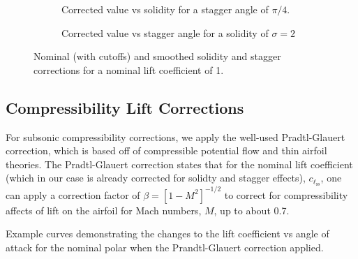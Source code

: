 \begin{figure}[htb]
     \centering
     \begin{subfigure}[t]{0.45\textwidth}
         \centering
        
        \caption{Corrected value vs solidity for a stagger angle of \(\pi/4\).}
        \label{fig:solidtysmoothed}
     \end{subfigure}
     \hfill
     \begin{subfigure}[t]{0.45\textwidth}
         \centering
         
         \caption{Corrected value vs stagger angle for a solidity of \(\sigma=2\)}
         \label{fig:staggersmoothed}
     \end{subfigure}
     \caption{Nominal (with cutoffs) and smoothed solidity and stagger corrections for a nominal lift coefficient of 1.}
        \label{fig:cascadesmoothed}
\end{figure}



\subsection{Compressibility Lift Corrections}


For subsonic compressibility corrections, we apply the well-used Pradtl-Glauert correction, which is based off of compressible potential flow and thin airfoil theories.
%
The Pradtl-Glauert correction states that for the nominal lift coefficient (which in our case is already corrected for solidty and stagger effects), \(c_{\ell_\text{ss}}\), one can apply a correction factor of \(\beta = \left[1-M^2\right]^{-1/2}\) to correct for compressibility affects of lift on the airfoil for Mach numbers, \(M\), up to about 0.7.

\begin{marginfigure}
	
    \caption{Example curves demonstrating the changes to the lift coefficient vs angle of attack for the nominal polar when the Prandtl-Glauert correction applied.}
	\label{fig:prandtlglauert-correction}
\end{marginfigure}

